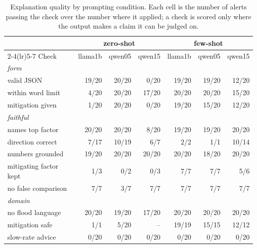 \begin{table}[htbp]
\centering
\caption{Explanation quality by prompting condition. Each cell is the number of alerts passing the check over the number where it applied; a check is scored only where the output makes a claim it can be judged on.}
\label{tab:stage2-conditions}
\small
\begin{tabular}{lrrrrrr}
\toprule
 & \multicolumn{3}{c}{zero-shot} & \multicolumn{3}{c}{few-shot} \\
\cmidrule(lr){2-4}\cmidrule(lr){5-7}
Check & llama1b & qwen05 & qwen15 & llama1b & qwen05 & qwen15 \\
\midrule
\multicolumn{7}{l}{\textit{form}} \\
\quad valid JSON & 19/20 & 20/20 & 0/20 & 19/20 & 19/20 & 12/20 \\
\quad within word limit & 4/20 & 20/20 & 17/20 & 20/20 & 20/20 & 15/20 \\
\quad mitigation given & 1/20 & 20/20 & 0/20 & 19/20 & 15/20 & 12/20 \\
\multicolumn{7}{l}{\textit{faithful}} \\
\quad names top factor & 20/20 & 20/20 & 8/20 & 19/20 & 19/20 & 20/20 \\
\quad direction correct & 7/17 & 10/19 & 6/7 & 2/2 & 1/1 & 10/14 \\
\quad numbers grounded & 19/20 & 20/20 & 20/20 & 20/20 & 18/20 & 20/20 \\
\quad mitigating factor kept & 1/3 & 0/2 & 0/3 & 7/7 & 7/7 & 5/6 \\
\quad no false comparison & 7/7 & 3/7 & 7/7 & 7/7 & 7/7 & 7/7 \\
\multicolumn{7}{l}{\textit{domain}} \\
\quad no flood language & 20/20 & 19/20 & 17/20 & 20/20 & 20/20 & 20/20 \\
\quad mitigation safe & 1/1 & 5/20 & -- & 19/19 & 15/15 & 12/12 \\
\quad slow-rate advice & 0/20 & 0/20 & 0/20 & 0/20 & 0/20 & 0/20 \\
\bottomrule
\end{tabular}
\end{table}
